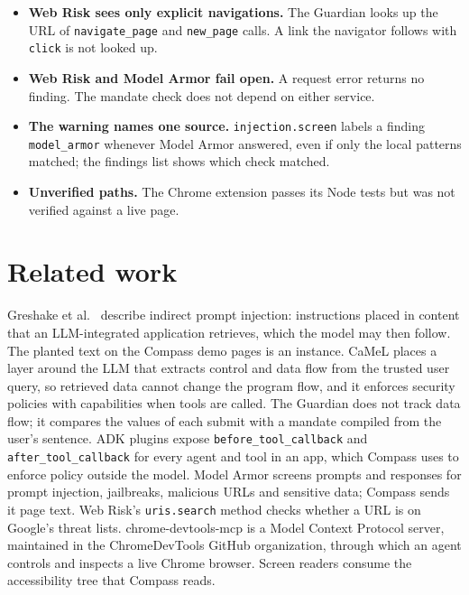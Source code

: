 \documentclass[11pt]{article}
\newcommand{\code}[1]{\texttt{#1}}
\begin{document}
\begin{itemize}
\item \textbf{Web Risk sees only explicit navigations.} The Guardian looks up the URL of \code{navigate\_page} and \code{new\_page} calls. A link the navigator follows with \code{click} is not looked up.
\item \textbf{Web Risk and Model Armor fail open.} A request error returns no finding. The mandate check does not depend on either service.
\item \textbf{The warning names one source.} \code{injection.screen} labels a finding \code{model\_armor} whenever Model Armor answered, even if only the local patterns matched; the findings list shows which check matched.
\item \textbf{Unverified paths.} The Chrome extension passes its Node tests but was not verified against a live page.
\end{itemize}

\section{Related work}

Greshake et al.\ \cite{greshake2023} describe indirect prompt injection: instructions placed in content that an LLM-integrated application retrieves, which the model may then follow. The planted text on the Compass demo pages is an instance. CaMeL \cite{debenedetti2025} places a layer around the LLM that extracts control and data flow from the trusted user query, so retrieved data cannot change the program flow, and it enforces security policies with capabilities when tools are called. The Guardian does not track data flow; it compares the values of each submit with a mandate compiled from the user's sentence. ADK plugins \cite{adkplugins} expose \code{before\_tool\_callback} and \code{after\_tool\_callback} for every agent and tool in an app, which Compass uses to enforce policy outside the model. Model Armor \cite{modelarmor} screens prompts and responses for prompt injection, jailbreaks, malicious URLs and sensitive data; Compass sends it page text. Web Risk's \code{uris.search} method \cite{webrisk} checks whether a URL is on Google's threat lists. chrome-devtools-mcp \cite{cdpmcp} is a Model Context Protocol server, maintained in the ChromeDevTools GitHub organization, through which an agent controls and inspects a live Chrome browser. Screen readers consume the accessibility tree that Compass reads.
\end{document}
